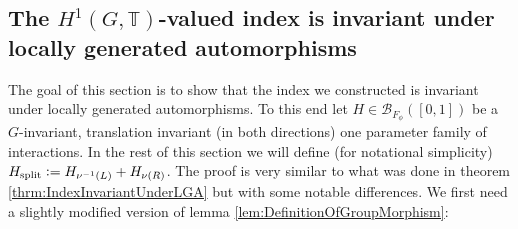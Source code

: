 \documentclass[12pt,a4paper,twoside]{article}
\newcommand{\defeq}{\vcentcolon=}
\newcommand{\BB}{\mathcal B}
\newcommand{\TT}{\mathbb T}
\theoremstyle{definition}
\numberwithin{equation}{section}
\begin{document}
\subsection{The $H^1(G,\TT)$-valued index is invariant under locally generated automorphisms}\label{sec:H^1IndexInvariantUnderRotations}
The goal of this section is to show that the index we constructed is invariant under locally generated automorphisms. To this end let $H\in \BB_{F_\phi}([0,1])$ be a $G$-invariant, translation invariant (in both directions) one parameter family of interactions. In the rest of this section we will define (for notational simplicity) $H_{\text{split}}\defeq H_{\nu^{-1}(L)}+H_{\nu(R)}$. The proof is very similar to what was done in theorem \ref{thrm:IndexInvariantUnderLGA} but with some notable differences. We first need a slightly modified version of lemma \ref{lem:DefinitionOfGroupMorphism}:
\end{document}

